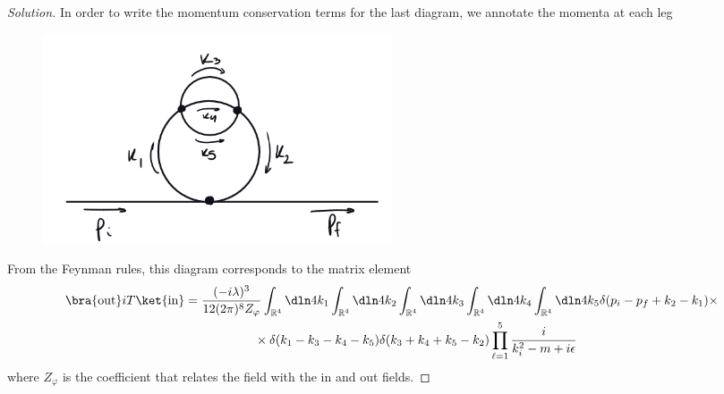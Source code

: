 \begin{proof}[Solution]
   In order to write the momentum conservation terms for the last diagram, we annotate the momenta at each leg
   \begin{figure}[H]
      \centering
      \includegraphics[width=0.5\textwidth]{p2b.png}
   \end{figure}
   \noindent From the Feynman rules, this diagram corresponds to the matrix element
   \begin{align*}
      \bra{\mathrm{out}}iT\ket{\mathrm{in}}  &= \frac{(-i \lambda)^3}{12(2 \pi)^8 Z_\varphi} \int_{\mathbb{R}^4} \dln4{k_1} \int_{\mathbb{R}^4} \dln4{k_2} \int_{\mathbb{R}^4} \dln4{k_3} \int_{\mathbb{R}^4} \dln4{k_4} \int_{\mathbb{R}^4} \dln4{k_5} \delta(p_i - p_f + k_2 - k_1) \times \\
                    &{}\phantom{=\frac{(-i \lambda)^3}{(2 \pi)^8 S Z_\varphi}} \times \delta(k_1 - k_3 - k_4 - k_5) \delta(k_3 + k_4 + k_5 - k_2) \prod_{\ell = 1}^5 \frac{i}{k_i^2 - m + i \epsilon}
   \end{align*}
   where \(Z_\varphi\) is the coefficient that relates the field with the in and out fields.
\end{proof}
